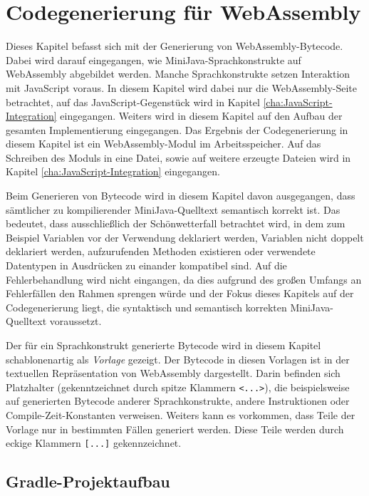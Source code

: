 \chapter{Codegenerierung für WebAssembly}
\label{cha:Codegenerierung-für-WebAssembly}

Dieses Kapitel befasst sich mit der Generierung von WebAssembly-Bytecode. Dabei wird darauf eingegangen, wie MiniJava-Sprachkonstrukte auf WebAssembly abgebildet werden. Manche Sprachkonstrukte setzen Interaktion mit JavaScript voraus. In diesem Kapitel wird dabei nur die WebAssembly-Seite betrachtet, auf das JavaScript-Gegenstück wird in Kapitel \ref{cha:JavaScript-Integration} eingegangen. Weiters wird in diesem Kapitel auf den Aufbau der gesamten Implementierung eingegangen. Das Ergebnis der Codegenerierung in diesem Kapitel ist ein WebAssembly-Modul im Arbeitsspeicher. Auf das Schreiben des Moduls in eine Datei, sowie auf weitere erzeugte Dateien wird in Kapitel \ref{cha:JavaScript-Integration} eingegangen.

Beim Generieren von Bytecode wird in diesem Kapitel davon ausgegangen, dass sämtlicher zu kompilierender MiniJava-Quelltext semantisch korrekt ist. Das bedeutet, dass ausschließlich der Schönwetterfall betrachtet wird, in dem zum Beispiel Variablen vor der Verwendung deklariert werden, Variablen nicht doppelt deklariert werden, aufzurufenden Methoden existieren oder verwendete Datentypen in Ausdrücken zu einander kompatibel sind. Auf die Fehlerbehandlung wird nicht eingangen, da dies aufgrund des großen Umfangs an Fehlerfällen den Rahmen sprengen würde und der Fokus dieses Kapitels auf der Codegenerierung liegt, die syntaktisch und semantisch korrekten MiniJava-Quelltext voraussetzt.

Der für ein Sprachkonstrukt generierte Bytecode wird in diesem Kapitel schablonenartig als \emph{Vorlage} gezeigt. Der Bytecode in diesen Vorlagen ist in der textuellen Repräsentation von WebAssembly dargestellt. Darin befinden sich Platzhalter (gekenntzeichnet durch spitze Klammern \lstinline{<...>}), die beispielsweise auf generierten Bytecode anderer Sprachkonstrukte, andere Instruktionen oder Compile-Zeit-Konstanten verweisen. Weiters kann es vorkommen, dass Teile der Vorlage nur in bestimmten Fällen generiert werden. Diese Teile werden durch eckige Klammern \lstinline{[...]} gekennzeichnet.

\section{Gradle-Projektaufbau}

